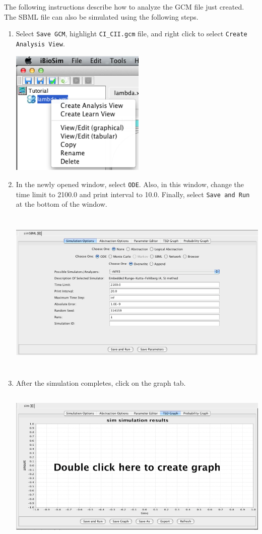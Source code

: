 \documentclass[titlepage,11pt]{article}
\begin{document}
The following instructions describe how to analyze the GCM file just 
created.  The SBML file can also be simulated using the following steps.  
\begin{enumerate}
\item Select {\tt Save GCM}, highlight {\tt CI\_CII.gcm} file, and
  right click to select {\tt Create Analysis View}.

\includegraphics[height=60mm]{screenshots/GCMAnalysis}

\item In the newly opened window, select {\tt ODE}.
      Also, in this window, change the time limit to 2100.0 and print interval
      to 10.0. Finally, select {\tt Save and Run} at the bottom of the window.

\includegraphics[height=80mm]{screenshots/analysisView}

\clearpage

\item After the simulation completes, click on the graph tab.

\includegraphics[height=75mm]{screenshots/emptyGraph}


\end{enumerate}
\end{document}
